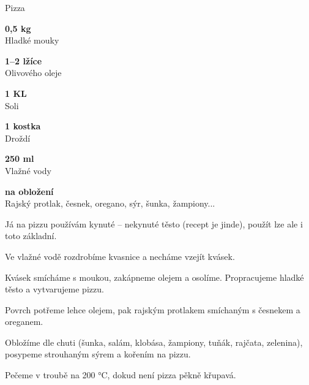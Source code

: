 \documentclass[11pt,a4paper]{article}
\begin{document}
\begin{recipe}[DarkRed]{Pizza}
    \begin{ingredients}
        \item \parbox[t]{\linewidth}{\raggedright \weight \textbf{0,5 kg}\\ Hladké mouky}
        \item \parbox[t]{\linewidth}{\raggedright \spoon \textbf{1--2 lžíce}\\ Olivového oleje}
        \item \parbox[t]{\linewidth}{\raggedright \spoon \textbf{1 KL}\\ Soli}
        \item \parbox[t]{\linewidth}{\raggedright \piece \textbf{1 kostka}\\ Droždí}
        \item \parbox[t]{\linewidth}{\raggedright \liquid \textbf{250 ml}\\ Vlažné vody}
        \item \parbox[t]{\linewidth}{\raggedright \indefinite \textbf{na obložení}\\ Rajský protlak, česnek, oregano, sýr, šunka, žampiony...}
    \end{ingredients}
    \begin{steps}
        \item Já na pizzu používám kynuté – nekynuté těsto (recept je jinde), použít lze ale i toto základní.
        \item Ve vlažné vodě rozdrobíme kvasnice a necháme vzejít kvásek.
        \item Kvásek smícháme s moukou, zakápneme olejem a osolíme. Propracujeme hladké těsto a vytvarujeme pizzu.
        \item Povrch potřeme lehce olejem, pak rajským protlakem smíchaným s česnekem a oreganem.
        \item Obložíme dle chuti (šunka, salám, klobása, žampiony, tuňák, rajčata, zelenina), posypeme strouhaným sýrem a kořením na pizzu.
        \item Pečeme v troubě na 200 °C, dokud není pizza pěkně křupavá.
    \end{steps}
\end{recipe}

\end{document}
